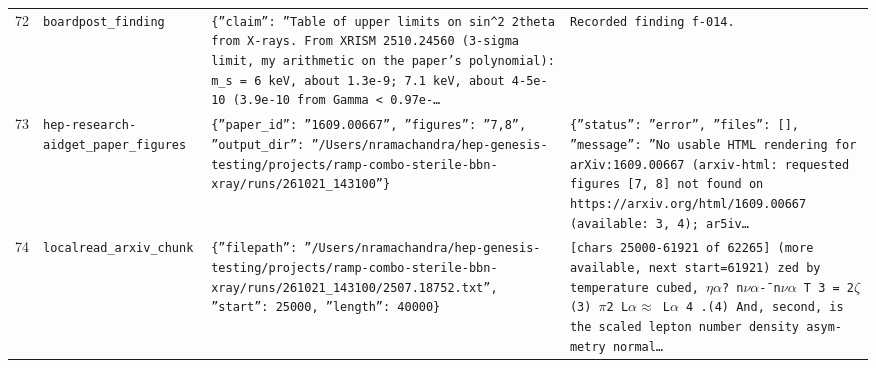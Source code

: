 \documentclass[11pt,a4paper]{article}
\begin{document}
\begin{longtable}{@{}p{}p{}p{}p{}@{}}
72 & \texttt{board}\newline\texttt{post\_\allowbreak{}finding} & \texttt{\{''claim'':\allowbreak{} ''Table of upper limits on sin\textasciicircum{}\allowbreak{}2 2theta from X-rays. From XRISM 2510.24560 (3-sigma limit,\allowbreak{} my arithmetic on the paper's polynomial)\allowbreak{}:\allowbreak{} m\_\allowbreak{}s =\allowbreak{} 6 keV,\allowbreak{} about 1.3e-9;\allowbreak{} 7.1 keV,\allowbreak{} about 4-5e-10 (3.9e-10 from Gamma \textless{}\allowbreak{} 0.97e-\ldots{}\allowbreak{}} & \texttt{Recorded finding f-014.} \\
73 & \texttt{hep-research-aid}\newline\texttt{get\_\allowbreak{}paper\_\allowbreak{}figures} & \texttt{\{''paper\_\allowbreak{}id'':\allowbreak{} ''1609.00667'',\allowbreak{} ''figures'':\allowbreak{} ''7,\allowbreak{}8'',\allowbreak{} ''output\_\allowbreak{}dir'':\allowbreak{} ''/\allowbreak{}Users/\allowbreak{}nramachandra/\allowbreak{}hep-genesis-testing/\allowbreak{}projects/\allowbreak{}ramp-combo-sterile-bbn-xray/\allowbreak{}runs/\allowbreak{}261021\_\allowbreak{}143100''\}\allowbreak{}} & \texttt{\{''status'':\allowbreak{} ''error'',\allowbreak{} ''files'':\allowbreak{} []\allowbreak{},\allowbreak{} ''message'':\allowbreak{} ''No usable HTML rendering for arXiv:\allowbreak{}1609.00667 (arxiv-html:\allowbreak{} requested figures [7,\allowbreak{} 8]\allowbreak{} not found on https:\allowbreak{}/\allowbreak{}/\allowbreak{}arxiv.org/\allowbreak{}html/\allowbreak{}1609.00667 (available:\allowbreak{} 3,\allowbreak{} 4)\allowbreak{};\allowbreak{} ar5iv\ldots{}\allowbreak{}} \\
74 & \texttt{local}\newline\texttt{read\_\allowbreak{}arxiv\_\allowbreak{}chunk} & \texttt{\{''filepath'':\allowbreak{} ''/\allowbreak{}Users/\allowbreak{}nramachandra/\allowbreak{}hep-genesis-testing/\allowbreak{}projects/\allowbreak{}ramp-combo-sterile-bbn-xray/\allowbreak{}runs/\allowbreak{}261021\_\allowbreak{}143100/\allowbreak{}2507.18752.txt'',\allowbreak{} ''start'':\allowbreak{} 25000,\allowbreak{} ''length'':\allowbreak{} 40000\}\allowbreak{}} & \texttt{[chars 25000-61921 of 62265]\allowbreak{} (more available,\allowbreak{} next start=\allowbreak{}61921)\allowbreak{}  zed by temperature cubed,\allowbreak{} $\eta$$\alpha$? n$\nu$$\alpha$-¯n$\nu$$\alpha$ T 3 =\allowbreak{} 2$\zeta$(3)\allowbreak{} $\pi$2 L$\alpha$$\approx$ L$\alpha$ 4 .(4)\allowbreak{} And,\allowbreak{} second,\allowbreak{} is the scaled lepton number density asym- metry normal\ldots{}\allowbreak{}} \\

\end{longtable}
\end{document}
